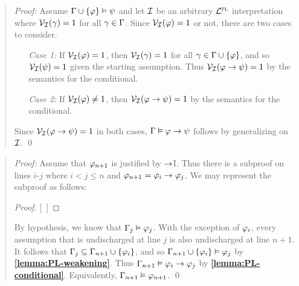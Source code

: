 \begin{quote} 
  \textit{Proof:} Assume $\Gamma \cup \lbrace\varphi\rbrace \vDash \psi$ and let $\mathcal{I}$ be an arbitrary $\mathcal{L}^{\textsc{pl}}$ interpretation where $\mathcal{V}_{\mathcal{I}}(\gamma) = 1$ for all $\gamma \in \Gamma$.
  Since $\mathcal{V}_{\mathcal{I}}(\varphi) = 1$ or not, there are two cases to consider. 

  \begin{enumerate}[leftmargin=.75in]
    \item[\it Case 1:] 
      If $\mathcal{V}_{\mathcal{I}}(\varphi) = 1$, then $\mathcal{V}_{\mathcal{I}}(\gamma) = 1$ for all $\gamma \in \Gamma \cup \lbrace\varphi\rbrace$, and so $\mathcal{V}_{\mathcal{I}}(\psi) = 1$ given the starting assumption.
      Thus $\mathcal{V}_{\mathcal{I}}(\varphi \rightarrow \psi) = 1$ by the semantics for the conditional.
    \item[\it Case 2:] 
      If $\mathcal{V}_{\mathcal{I}}(\varphi) \neq 1$, then $\mathcal{V}_{\mathcal{I}}(\varphi \rightarrow \psi) = 1$ by the semantics for the conditional.
  \end{enumerate}

  Since $\mathcal{V}_{\mathcal{I}}(\varphi \rightarrow \psi) = 1$ in both cases, $\Gamma \vDash \varphi \rightarrow \psi$ follows by generalizing on $\mathcal{I}$. 
  \qed
\end{quote}






\begin{quote} 
  \textit{Proof:} Assume that $\varphi_{n+1}$ is justified by $\rightarrow$I.
  Thus there is a subproof on lines $i$-$j$ where $i<j\leq n$ and $\varphi_{n+1}=\varphi_i \rightarrow \varphi_j$.
  We may represent the subproof as follows:

  \begin{proof}
  \open
    \metaA {}
  \close
  [\ ]{\metaA\eif\metaB} %
  \end{proof}

  By hypothesis, we know that $\Gamma_j \vDash \varphi_j$.
  With the exception of $\varphi_i$, every assumption that is undischarged at line $j$ is also undischarged at line $n+1$.
  It follows that $\Gamma_j\subseteq\Gamma_{n+1}\cup\lbrace\varphi_i\rbrace$, and so $\Gamma_{n+1}\cup\lbrace\varphi_i\rbrace \vDash \varphi_j$ by \textbf{\ref{lemma:PL-weakening}}.
  Thus $\Gamma_{n+1} \vDash \varphi_i \rightarrow \varphi_j$ by \textbf{\ref{lemma:PL-conditional}}.
  Equivalently, $\Gamma_{n+1} \vDash \varphi_{n+1}$.
  \qed
\end{quote}


